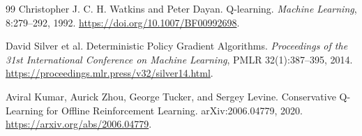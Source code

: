 \documentclass[UTF8,12pt,a4paper,fontset=fandol]{ctexbook}
\begin{document}
\begin{thebibliography}{99}
Christopher J. C. H. Watkins and Peter Dayan.
Q-learning.
\textit{Machine Learning}, 8:279--292, 1992.
\url{https://doi.org/10.1007/BF00992698}.

David Silver et al.
Deterministic Policy Gradient Algorithms.
\textit{Proceedings of the 31st International Conference on Machine Learning}, PMLR 32(1):387--395, 2014.
\url{https://proceedings.mlr.press/v32/silver14.html}.

Aviral Kumar, Aurick Zhou, George Tucker, and Sergey Levine.
Conservative Q-Learning for Offline Reinforcement Learning.
arXiv:2006.04779, 2020.
\url{https://arxiv.org/abs/2006.04779}.

\end{thebibliography}
\end{document}

